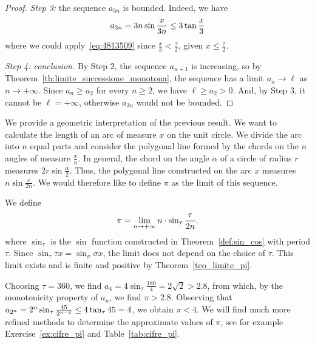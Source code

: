 \begin{proof}
\emph{Step 3:} the sequence $a_{3n}$ is bounded. Indeed, we have
\begin{align*}
 a_{3n} = 3n \sin \frac x {3n} 
 \le 3\operatorname{tan} \frac x 3
\end{align*}
where we could apply~\eqref{eq:4813509} since $\frac x 3 < \frac{\tau }{2}$,
given $x\le \frac {\tau} 2$.

\emph{Step 4: conclusion.} By Step 2, the sequence $a_{n+1}$ is increasing, so by Theorem~\ref{th:limite_successione_monotona}, the sequence has a limit $a_n\to \ell$ as $n\to +\infty$. Since $a_n \ge a_2$ for every $n\ge 2$, we have $\ell \ge a_2 >0$. And, by Step 3, it cannot be $\ell=+\infty$, otherwise $a_{3n}$ would not be bounded.
\end{proof}

We provide a geometric interpretation of the previous result. We want to
calculate the length of an arc of measure $x$ on the unit circle. We divide the
arc into $n$ equal parts and consider the polygonal line formed by the chords on
the $n$ angles of measure $\frac {x} n$. In general, the chord on the angle
$\alpha$ of a circle of radius $r$ measures $2r \sin \frac \alpha 2$. Thus, the
polygonal line constructed on the arc $x$ measures $n\sin\frac{x}{2n}$. We would
therefore like to define $\pi$ as the limit of this sequence.

\begin{definition}%
  \label{def:pi}%
We define
\[
 \pi 
  = \lim_{n\to +\infty} n\cdot \sin_\tau \frac \tau {2n}.
\]
where $\sin_\tau$ is the $\sin$ function constructed in
Theorem~\ref{def:sin_cos} with period $\tau$. Since $\sin_\tau \tau x =
\sin_\sigma \sigma x$, the limit does not depend on the choice of $\tau$. This
limit exists and is finite and positive by Theorem~\ref{teo_limite_pi}.
\end{definition}

Choosing $\tau = 360$, we find $a_4 = 4 \sin_\tau \frac{180}{4} = 2 \sqrt 2 >
2.8$, from which, by the monotonicity property of $a_n$, we find $\pi > 2.8$.
Observing that $a_{2^n} = 2^n \sin_\tau \frac{45}{2^{n-2}}\le 4 \operatorname{tan}_\tau 45 =
4$, we obtain $\pi<4$. We will find much more refined methods to determine the
approximate values of $\pi$, see for example Exercise~\ref{ex:cifre_pi} and
Table~\ref{tab:cifre_pi}.

